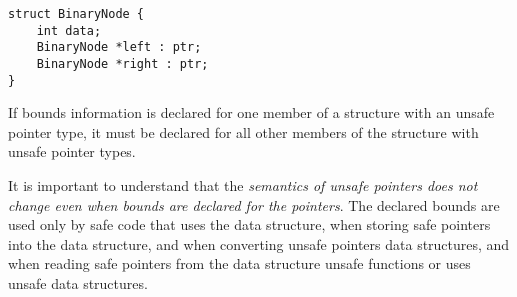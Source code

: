 \begin{verbatim}
struct BinaryNode {
    int data;
    BinaryNode *left : ptr;
    BinaryNode *right : ptr;
}
\end{verbatim}

If bounds information is declared for one member of a structure with an
unsafe pointer type, it must be declared for all other members of the
structure with unsafe pointer types.

It is important to understand that the \emph{semantics of unsafe
pointers does not change even when bounds are declared for the
pointers}. The declared bounds are used only by safe code that uses the
data structure, when storing safe pointers into the data structure, and
when converting unsafe pointers data structures, and when reading safe
pointers from the data structure unsafe functions or uses unsafe data
structures.



